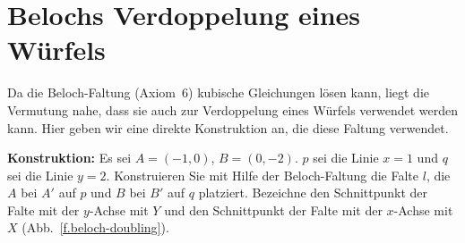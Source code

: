 \section{Belochs Verdoppelung eines Würfels}\label{s.cube2}

Da die Beloch-Faltung (Axiom~6) kubische Gleichungen lösen kann, liegt die Vermutung nahe, dass sie auch zur Verdoppelung eines Würfels verwendet werden kann. Hier geben wir eine direkte Konstruktion an, die diese Faltung verwendet.

\noindent\textbf{Konstruktion:}
Es sei $A=(-1,0)$, $B=(0,-2)$. $p$ sei die Linie $x=1$ und $q$ sei die Linie $y=2$. Konstruieren Sie mit Hilfe der Beloch-Faltung die Falte $l$, die $A$ bei $A'$ auf $p$ und $B$ bei $B'$ auf $q$ platziert. Bezeichne den Schnittpunkt der Falte mit der $y$-Achse mit $Y$ und den Schnittpunkt der Falte mit der $x$-Achse mit $X$ (Abb.~\ref{f.beloch-doubling}).


